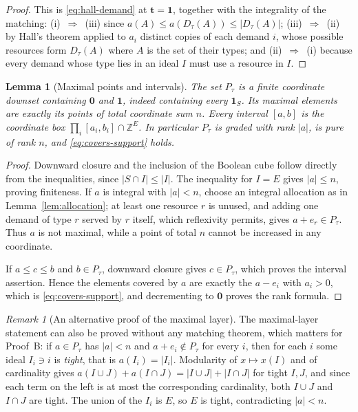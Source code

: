 \documentclass[11pt]{article}
\numberwithin{equation}{section}
\newtheorem{lemma}[theorem]{Lemma}
\theoremstyle{definition}
\theoremstyle{remark}
\newtheorem{remark}[theorem]{Remark}
\newcommand{\Z}{\mathbb Z}
\newcommand{\one}{\mathbf 1}
\newcommand{\zero}{\mathbf 0}
\begin{document}
\begin{proof}
This is \eqref{eq:hall-demand} at $\mathbf t=\one$, together with the
integrality of the matching: (i)~$\Rightarrow$~(iii) since
$a(A)\le a(D_\tau(A))\le|D_\tau(A)|$; (iii)~$\Rightarrow$~(ii) by Hall's
theorem applied to $a_i$ distinct copies of each demand $i$, whose possible
resources form $D_\tau(A)$ where $A$ is the set of their types; and
(ii)~$\Rightarrow$~(i) because every demand whose type lies in an ideal $I$
must use a resource in $I$.
\end{proof}

\begin{lemma}[Maximal points and intervals]
\label{lem:max}
The set $P_\tau$ is a finite coordinate downset containing $\zero$ and
$\one$, indeed containing every $\one_S$. Its maximal elements are exactly its
points of total coordinate sum $n$. Every interval $[a,b]$ is the coordinate
box $\prod_i[a_i,b_i]\cap\Z^E$. In particular $P_\tau$ is graded with rank
$|a|$, is pure of rank $n$, and \eqref{eq:covers-support} holds.
\end{lemma}

\begin{proof}
Downward closure and the inclusion of the Boolean cube follow directly from
the inequalities, since $|S\cap I|\le|I|$. The inequality for $I=E$ gives
$|a|\le n$, proving finiteness. If $a$ is integral with $|a|<n$, choose an
integral allocation as in Lemma~\ref{lem:allocation}; at least one resource
$r$ is unused, and adding one demand of type $r$ served by $r$ itself, which
reflexivity permits, gives $a+e_r\in P_\tau$. Thus $a$ is not maximal, while a
point of total $n$ cannot be increased in any coordinate.

If $a\le c\le b$ and $b\in P_\tau$, downward closure gives $c\in P_\tau$,
which proves the interval assertion. Hence the elements covered by $a$ are
exactly the $a-e_i$ with $a_i>0$, which is \eqref{eq:covers-support}, and
decrementing to $\zero$ proves the rank formula.
\end{proof}

\begin{remark}[An alternative proof of the maximal layer]
\label{rem:tight}
The maximal-layer statement can also be proved without any matching theorem,
which matters for Proof~B: if $a\in P_\tau$ has $|a|<n$ and $a+e_i\notin
P_\tau$ for every $i$, then for each $i$ some ideal $I_i\ni i$ is
\emph{tight}, that is $a(I_i)=|I_i|$. Modularity of $x\mapsto x(I)$ and of
cardinality gives
$a(I\cup J)+a(I\cap J)=|I\cup J|+|I\cap J|$ for tight $I,J$, and since each
term on the left is at most the corresponding cardinality, both $I\cup J$ and
$I\cap J$ are tight. The union of the $I_i$ is $E$, so $E$ is tight,
contradicting $|a|<n$.
\end{remark}
\end{document}
